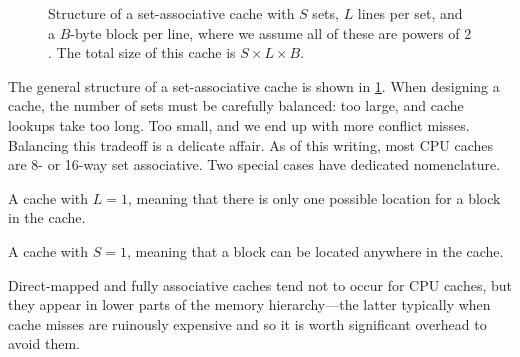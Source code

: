 \begin{figure}

  \caption{Structure of a set-associative cache with $S$ sets, $L$
    lines per set, and a $B$-byte block per line, where we assume all
    of these are powers of $2$.  The total size of this cache is
    $S \times L \times B$.}
  \label{fig:setassoc-cache}
\end{figure}

The general structure of a set-associative cache is shown in
\cref{fig:setassoc-cache}.  When designing a cache, the number of sets
must be carefully balanced: too large, and cache lookups take too
long.  Too small, and we end up with more conflict misses.  Balancing
this tradeoff is a delicate affair.  As of this writing, most CPU
caches are 8- or 16-way set associative.  Two special cases have
dedicated nomenclature.

\begin{definition}
  A cache with $L=1$, meaning that there is only one possible location
  for a block in the cache.
\end{definition}

\begin{definition}
  A cache with $S=1$, meaning that a block can be located anywhere in
  the cache.
\end{definition}

Direct-mapped and fully associative caches tend not to occur for CPU
caches, but they appear in lower parts of the memory hierarchy---the
latter typically when cache misses are ruinously expensive and so it
is worth significant overhead to avoid them.

